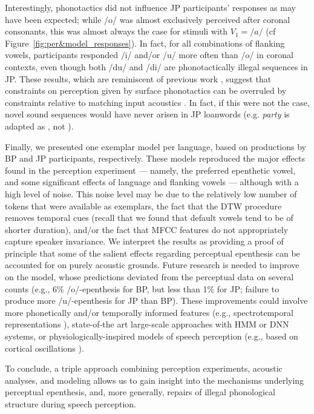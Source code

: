 Interestingly, phonotactics did not influence JP participants' responses as may have been expected; while /o/ was almost exclusively perceived after coronal consonants, this was almost always the case for stimuli with $V_{1} = /a/$ (cf Figure~\ref{fig:per&model_responses}). In fact, for all combinations of flanking vowels, participants responded /i/ and/or /u/ more often than /o/ in coronal contexts, even though both /du/ and /di/ are phonotactically illegal sequences in JP. These results, which are reminiscent of previous work \cite{monahan2009, mattingley2015}, suggest that constraints on perception given by surface phonotactics can be overruled by constraints relative to matching input acoustics \cite{dupoux2011}. In fact, if this were not the case, novel sound sequences would have never arisen in JP loanwords (e.g. \textit{party} is adapted as , not ). 

Finally, we presented one exemplar model per language, based on productions by BP and JP participants, respectively. These models reproduced the major effects found in the perception experiment --- namely, the preferred epenthetic vowel, and some significant effects of language and flanking vowels --- although with a high level of noise. This noise level may be due to the relatively low number of tokens that were available as exemplars, the fact that the DTW procedure removes temporal cues (recall that we found that default vowels tend to be of shorter duration), and/or the fact that MFCC features do not appropriately capture speaker invariance.
We interpret the results as providing a proof of principle that some of the salient effects regarding perceptual epenthesis can be accounted for on purely acoustic grounds. Future research is needed to improve on the model, whose predictions deviated from the perceptual data on several counts (e.g., 6\% /o/-epenthesis for BP, but less than 1\% for JP; failure to produce more /u/-epenthesis for JP than BP). These improvements could involve more phonetically and/or temporally informed features (e.g., spectrotemporal representations \cite{chi2005}), state-of-the art large-scale approaches with HMM or DNN systems, or physiologically-inspired models of speech perception (e.g., based on cortical oscillations \cite{hyafil2015}). 

To conclude, a triple approach combining perception experiments, acoustic analyses, and modeling allows us to gain insight into the mechanisms underlying perceptual epenthesis, and, more generally, repairs of illegal phonological structure during speech perception.



